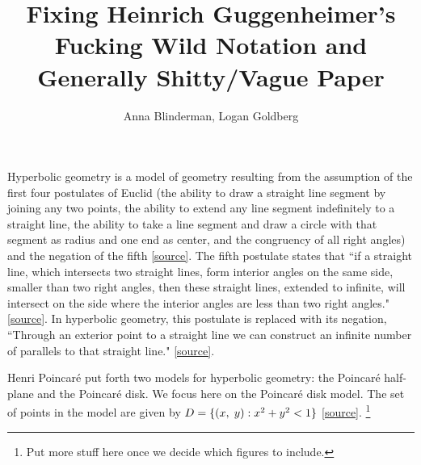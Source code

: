\documentclass[12pt]{article}
\title{Fixing Heinrich Guggenheimer's Fucking Wild Notation and Generally Shitty/Vague Paper}
\author{Anna Blinderman, Logan Goldberg}
\date{}
\newcommand{\poincare}{Poincar\'{e} }
\newcommand{\ttc}{, \hspace{1mm}}
\theoremstyle{plain}
\theoremstyle{definition}
\begin{document}
\maketitle


Hyperbolic geometry is a model of geometry resulting from the assumption of the first four postulates of Euclid (the ability to draw a straight line segment by joining any two points, the ability to extend any line segment indefinitely to a straight line, the ability to take a line segment and draw a circle with that segment as radius and one end as center, and the congruency of all right angles) and the negation of the fifth \href{http://mathworld.wolfram.com/EuclidsPostulates.html}{[source]}. The fifth postulate states that ``if a straight line, which intersects two straight lines, form interior angles on the same side, smaller than two right angles, then these straight lines, extended to infinite, will intersect on the side where the interior angles are less than two right angles." [\href{https://pdfs.semanticscholar.org/ed0e/d1fee9bbe60b24be373ac1207d17ecb90b4a.pdf}{source}]. In hyperbolic geometry, this postulate is replaced with its negation, ``Through an exterior point to a straight line we can construct an infinite number of parallels to that straight line." \href{https://pdfs.semanticscholar.org/ed0e/d1fee9bbe60b24be373ac1207d17ecb90b4a.pdf}{[source]}.
	
Henri \poincare put forth two models for hyperbolic geometry: the \poincare half-plane and the \poincare disk. We focus here on the \poincare disk model. The set of points in the model are given by $D = \{(x\ttc y): x^2 + y^2 < 1\}$ \href{http://math2.uncc.edu/~frothe/3181alllhyp1_7.pdf}{[source]}.  \footnote{Put more stuff here once we decide which figures to include.} 
	
\end{document}

